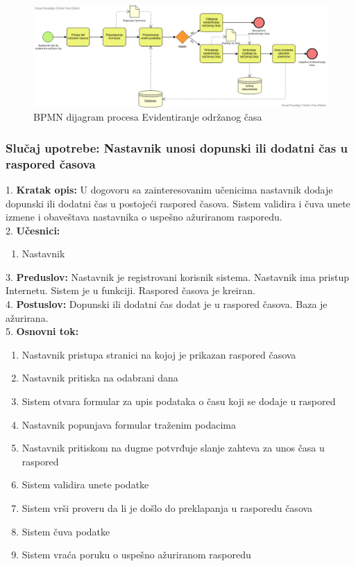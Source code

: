 \documentclass{article}
\begin{document}
\begin{figure} [!ht]
    \begin{center}
        \includegraphics[scale=0.36]{imgs/BPMN_evidentiranje_casa.png}
    \end{center}
\caption{BPMN dijagram procesa Evidentiranje održanog časa}
\end{figure}


\subsubsection{Slučaj upotrebe: Nastavnik unosi dopunski ili dodatni čas u raspored časova} 
1. \textbf{Kratak opis:} U dogovoru sa zainteresovanim učenicima nastavnik dodaje dopunski ili dodatni čas u postojeći raspored časova. Sistem validira i čuva unete izmene i obaveštava nastavnika o uspešno ažuriranom rasporedu. \\

2. \textbf{Učesnici:}
\begin{enumerate} [label=(\alph*)]
\item Nastavnik
\end{enumerate} 

3. \textbf{Preduslov:} Nastavnik je registrovani korisnik sistema. Nastavnik ima pristup Internetu. Sistem je u funkciji. Raspored časova je kreiran. \\

4. \textbf{Postuslov:} Dopunski ili dodatni čas dodat je u raspored časova. Baza je ažurirana. \\

5. \textbf{Osnovni tok:} 
\begin{enumerate} [label=(\alph*)]
\item Nastavnik pristupa stranici na kojoj je prikazan raspored časova
\item Nastavnik pritiska na odabrani dana  
\item Sistem otvara formular za upis podataka o času koji se dodaje u raspored
\item Nastavnik popunjava formular traženim podacima
\item Nastavnik pritiskom na dugme potvrđuje slanje zahteva za unos časa u raspored
\item Sistem validira unete podatke
\item Sistem vrši proveru da li je došlo do preklapanja u rasporedu časova
\item Sistem čuva podatke
\item Sistem vraća poruku o uspešno ažuriranom rasporedu
\end{enumerate}
\end{document}

